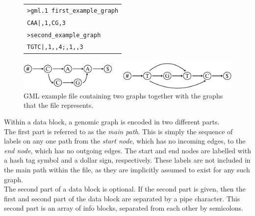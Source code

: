 \documentclass[a4paper,12pt,twoside,BCOR=10mm]{scrbook}
\begin{document}
\begin{figure}[!htb]
\centering
\begin{tabularx}{1.0\textwidth}{ | X | }
\hline
\texttt{>gml.1 first\_example\_graph} \\
\texttt{CAA|,1,CG,3} \\
\texttt{>second\_example\_graph} \\
\texttt{TGTC|,1,,4;,1,,3} \\
\hline
\end{tabularx}
\includegraphics[width=\textwidth]{evo_fig_second_gml_example.pdf}
\caption[GML example file containing two graphs]{GML example file containing two graphs together with the graphs that the file represents.} \label{fig:evo_fig_second_gml_example}
\end{figure}

Within a data block, a genomic graph is encoded in two different parts. \\
The first part is referred to as the \textit{main path}.
This is simply the sequence of labels on any one path from the \textit{start node},
which has no incoming edges, to the \textit{end node}, which has no outgoing edges.
The start and end nodes are labelled with a hash tag symbol and a dollar sign, respectively.
These labels are not included in the main path within the file, as they are implicitly assumed
to exist for any such graph. \\
The second part of a data block is optional.
If the second part is given, then the first and second part of the data block are separated by a pipe character.
This second part is an array of info blocks, separated from each other by semicolons.
\end{document}
